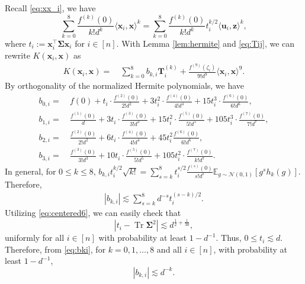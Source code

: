 \documentclass[twoside,11pt]{article}
\newcommand{\E}{\mathbb{E}}
\def\bT{{\boldsymbol T}}
\def\bu{{\boldsymbol u}}
\def\bx{{\boldsymbol x}}
\def\bz{{\boldsymbol z}}
\def\bSigma{{\boldsymbol \Sigma}}
\newcommand{\Tr}{\operatorname{Tr}}
\newcommand{\1}{\mathbf{1}}
\begin{document}
Recall \eqref{eq:xx_i}, we have 
   $$ \sum_{k=0}^8 \frac{f^{(k)}(0)}{k!d^k} \langle \bx_i,\bx \rangle^k=\sum_{k=0}^8 \frac{f^{(k)}(0)}{k!d^k} t_i^{k/2}\langle \bu_i,\bz \rangle^k,$$
where  $t_{i}:=\bx_i^\top\bSigma\bx_i$ for $i\in[n]$.
With Lemma \ref{lem:hermite} and \eqref{eq:Tij}, we can rewrite $K(\bx_i,\bx)$ as
\begin{align}\label{eq:taylor_expansion}
    K(\bx_i,\bx)=~&\sum_{k=0}^8 b_{k,i}\bT_{i}^{(k)}+\frac{f^{(9)}(\zeta_{i})}{9!d^9}\langle \bx_i,\bx \rangle^9 .
\end{align} 
By orthogonality of the normalized Hermite polynomials, we have  
\begin{align}
    b_{0,i}=~&f(0)+t_{i}\cdot \frac{f^{(2)}(0)}{2!d^2}+3t_{i}^2\cdot \frac{f^{(4)}(0)}{4!d^4}+15t_{i}^3\cdot \frac{f^{(6)}(0)}{6!d^6},\label{eq:b0i}\\
    b_{1,i}=~&\frac{f^{(1)}(0)}{ d }+3t_{i}\cdot \frac{f^{(3)}(0)}{3!d^3}+15t_{i}^2\cdot \frac{f^{(5)}(0)}{5!d^5}+105t_{i}^3\cdot \frac{f^{(7)}(0)}{7!d^7},\label{eq:b1i}\\
    b_{2,i}=~&\frac{f^{(2)}(0)}{2!d^2}+6t_{i}\cdot \frac{f^{(4)}(0)}{4!d^4}+45t_{i}^2\frac{f^{(6)}(0)}{6!d^6}, \\
    b_{3,i}=~&\frac{f^{(3)}(0)}{3!d^3}+10t_{i}\cdot \frac{f^{(5)}(0)}{5!d^5}+105t_{i}^2\cdot \frac{f^{(7)}(0)}{k!d^7}.
\end{align}
In general, 
for $0\leq k\leq 8$, $
    b_{k,i}t_i^{k/2}\sqrt{k!}
    =\sum_{s=k}^8 t_i^{s/2}\frac{f^{(s)}(0)}{s!d^s}\E_{g\sim \mathcal N(0,1)}[g^s h_k(g)].$
Therefore,  
\begin{align}\label{eq:bki}
|b_{k,i}| \lesssim \sum_{s=k}^8 d^{-s} t_i^{(s-k)/2}.
\end{align}
Utilizing \eqref{eq:centered6}, we can easily check that 
\begin{equation}\label{eq:t_i_concen}
    |t_i-\Tr\bSigma^2|\lesssim d^{\frac{1}{2}+\frac{1}{30}},
\end{equation}uniformly for all $i\in [n]$ with probability at least $1-d^{-1}$.  Thus, $0\le t_i\lesssim d$. Therefore, from \eqref{eq:bki}, for $k=0,1,\ldots,8$ and all $i\in [n]$, with probability  at least $1-d^{-1}$,
\begin{equation}\label{eq:b_ki_bound}
    |b_{k,i}| \lesssim d^{-k}.
\end{equation}
\end{document}
